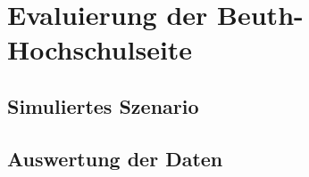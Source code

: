 %
%
%
%

\section{Evaluierung der Beuth-Hochschulseite}
\subsection{Simuliertes Szenario}
\subsection{Auswertung der Daten}
